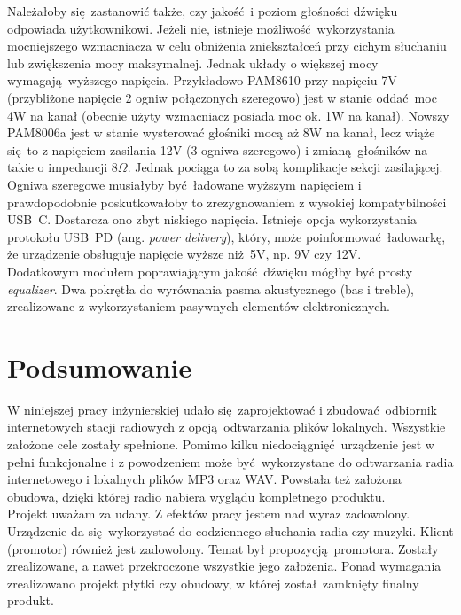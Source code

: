 \documentclass[polish]{aghengthesis}
\begin{document}
			Należałoby się zastanowić także, czy jakość i poziom głośności dźwięku odpowiada użytkownikowi. Jeżeli nie, istnieje możliwość wykorzystania mocniejszego wzmacniacza w celu obniżenia zniekształceń przy cichym słuchaniu lub zwiększenia mocy maksymalnej. Jednak układy o większej mocy wymagają wyższego napięcia.
			Przykładowo PAM8610\textsuperscript{\cite{ch5_pam8610}} przy napięciu 7V (przybliżone napięcie 2 ogniw połączonych szeregowo) jest w stanie oddać moc 4W na kanał (obecnie użyty wzmacniacz posiada moc ok. 1W na kanał). Nowszy PAM8006a\textsuperscript{\cite{ch5_pam8006a}} jest w stanie wysterować głośniki mocą aż 8W na kanał, lecz wiąże się to z napięciem zasilania 12V (3 ogniwa szeregowo) i zmianą głośników na takie o impedancji $8 \Omega$.
			Jednak pociąga to za sobą komplikacje sekcji zasilającej. Ogniwa szeregowe musiałyby być ładowane wyższym napięciem i prawdopodobnie poskutkowałoby to zrezygnowaniem z wysokiej kompatybilności USB~C. Dostarcza ono zbyt niskiego napięcia. Istnieje opcja wykorzystania protokołu USB~PD (ang. \textit{power delivery}), który, może poinformować ładowarkę, że urządzenie obsługuje napięcie wyższe niż 5V, np. 9V czy 12V.
			$ $\\
			
			Dodatkowym modułem poprawiającym jakość dźwięku mógłby być prosty \textit{equalizer}. Dwa pokrętła do wyrównania pasma akustycznego (bas i treble), zrealizowane z wykorzystaniem pasywnych elementów elektronicznych.
			
	\section{Podsumowanie}
	
		W niniejszej pracy inżynierskiej udało się zaprojektować i zbudować odbiornik internetowych stacji radiowych z opcją odtwarzania plików lokalnych.
		Wszystkie założone cele zostały spełnione. Pomimo kilku niedociągnięć urządzenie jest w pełni funkcjonalne i z powodzeniem może być wykorzystane do odtwarzania radia internetowego i lokalnych plików MP3 oraz WAV. Powstała też założona obudowa, dzięki której radio nabiera wyglądu kompletnego produktu.
		$ $\\
		
		Projekt uważam za udany. 
		Z efektów pracy jestem nad wyraz zadowolony. Urządzenie da się wykorzystać do codziennego słuchania radia czy muzyki.
		Klient (promotor) również jest zadowolony. Temat był propozycją promotora. Zostały zrealizowane, a nawet przekroczone wszystkie jego założenia. Ponad wymagania zrealizowano projekt płytki czy obudowy, w której został zamknięty finalny produkt.
		$ $\\
		
\end{document}
